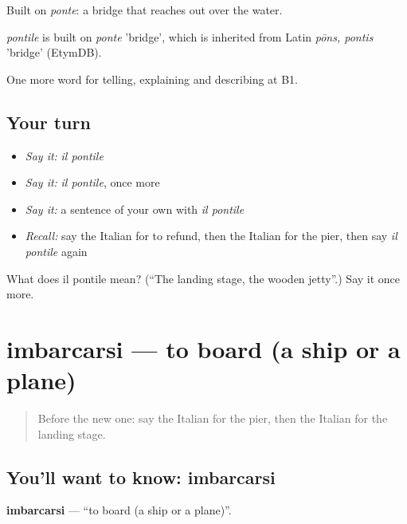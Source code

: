 Built on \emph{ponte}: a bridge that reaches out over the water.

\begin{cousinweb}
\emph{pontile} is built on \emph{ponte} 'bridge', which is inherited from Latin \emph{pōns, pontis} 'bridge' (EtymDB).
\end{cousinweb}

\begin{grammarlens}[title={What you've built}]
One more word for telling, explaining and describing at B1.
\end{grammarlens}

\subsection*{Your turn}
\begin{itemize}
\raggedright
  \item \emph{Say it:} \emph{il pontile}
  \item \emph{Say it:} \emph{il pontile}, once more
  \item \emph{Say it:} a sentence of your own with \emph{il pontile}
  \item \emph{Recall:} say the Italian for to refund, then the Italian for the pier, then say \emph{il pontile} again
\end{itemize}

\begin{tcolorbox}[breakable,colback=teal!4,colframe=teal!35!black,title={Before you move on}]
What does il pontile mean? (\textquotedblleft{}The landing stage, the wooden jetty\textquotedblright{}.) Say it once more.
\end{tcolorbox}
\section[imbarcarsi]{imbarcarsi — to board (a ship or a plane)}

\label{lesson:IT-C421-imbarcarsi}



\begin{quote}
Before the new one: say the Italian for the pier, then the Italian for the landing stage.
\end{quote}

\subsection*{You'll want to know: imbarcarsi}
\textbf{imbarcarsi} — \textquotedblleft{}to board (a ship or a plane)\textquotedblright{}.

